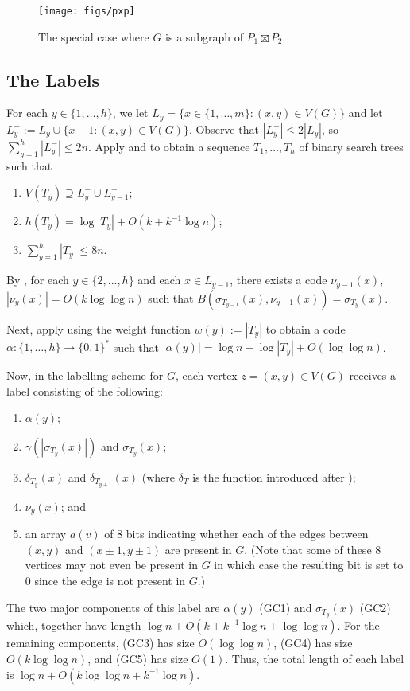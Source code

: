 \documentclass[kpfonts]{patmorin}
\let\le\leqslant
\begin{document}
\begin{figure}
  \begin{center}
    \texttt{[image: figs/pxp]}
  \end{center}
  \caption{The special case where $G$ is a subgraph of $P_1\boxtimes P_2$.}
\end{figure}


\subsection{The Labels}

For each $y\in\{1,\ldots,h\}$, we let $L_y=\{x\in\{1,\ldots,m\}:(x,y)\in V(G)\}$ and let $L^-_y:=L_y\cup\{x-1:(x,y)\in V(G)\}$.  Observe that $|L^-_y|\le 2|L_y|$, so $\sum_{y=1}^h |L^-_y|\le 2n$.   Apply  and  to obtain a sequence $T_1,\ldots,T_h$ of binary search trees such that

\begin{enumerate}[(PR1)]
  \item $V(T_y)\supseteq L^-_{y}\cup L^-_{y-1}$;
  \item $h(T_y)=\log|T_y| + O(k+k^{-1}\log n)$;
  \item $\sum_{y=1}^h|T_y| \le 8n$.
\end{enumerate}

By , for each $y\in\{2,\ldots,h\}$ and each $x\in L_{y-1}$, there exists a code $\nu_{y-1}(x)$, $|\nu_y(x)|=O(k\log\log n)$ such that $B(\sigma_{T_{y-1}}(x),\nu_{y-1}(x))=\sigma_{T_y}(x)$.

Next, apply  using the weight function $w(y):=|T_y|$ to obtain a code $\alpha:\{1,\ldots,h\}\to \{0,1\}^*$ such that $|\alpha(y)|=\log n - \log|T_y| + O(\log\log n)$.

Now, in the labelling scheme for $G$, each vertex $z=(x,y)\in V(G)$ receives a label consisting of the following:  
\begin{enumerate}[(GC1)]
  \item $\alpha(y)$;
  \item $\gamma(|\sigma_{T_y}(x)|)$ and $\sigma_{T_y}(x)$;
  \item $\delta_{T_y}(x)$ and $\delta_{T_{y+1}}(x)$ (where $\delta_T$ is the function  introduced after );
  \item $\nu_y(x)$; and
  \item an array $a(v)$ of $8$ bits indicating whether each of the edges between $(x,y)$ and $(x\pm 1,y\pm 1)$ are present in $G$.  (Note that some of these 8 vertices may not even be present in $G$ in which case the resulting bit is set to 0 since the edge is not present in $G$.)
\end{enumerate}
The two major components of this label are $\alpha(y)$ (GC1) and $\sigma_{T_y}(x)$ (GC2) which, together have length $\log n + O(k+k^{-1}\log n+\log\log n)$. For the remaining components, (GC3) has size $O(\log\log n)$, (GC4) has size $O(k\log\log n)$, and (GC5) has size $O(1)$.  Thus, the total length of each label is $\log n+ O(k\log\log n + k^{-1}\log n)$.  
\end{document}

